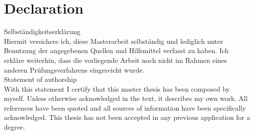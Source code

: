 \chapter*{Declaration}
\thispagestyle{empty}

Selbst\"andigkeitserkl\"arung \\
Hiermit versichere ich, diese Masterarbeit selbst\"andig und lediglich unter Benutzung der angegebenen Quellen und Hilfsmittel verfasst zu haben. Ich erkl\"are weiterhin, dass die vorliegende Arbeit noch nicht im Rahmen eines anderen Pr\"ufungsverfahrens eingereicht wurde.\\

Statement of authorship \\
With this statement I certify that this master thesis has been composed by myself. Unless otherwise acknowledged in the text, it describes my own work. All references have been quoted and all sources of information have been specifically acknowledged. This thesis has not been accepted in any previous application for a degree.  
